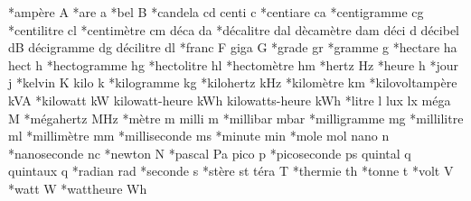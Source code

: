 *ampère             A%
*are                a%
*bel                B%
*candela            cd%
centi               c%
*centiare           ca%
*centigramme        cg%
*centilitre         cl%
*centimètre         cm%
déca                da%
*décalitre          dal%
dècamètre           dam%
déci                d%
décibel             dB%
décigramme             dg%
décilitre             dl%
*franc              F%
giga                G%
*grade              gr%
*gramme             g%
*hectare            ha%
hect                h%
*hectogramme        hg%
*hectolitre         hl%
*hectomètre         hm%
*hertz              Hz%
*heure              h%
*jour               j%
*kelvin             K%
kilo                k%
*kilogramme         kg%
*kilohertz          kHz%
*kilomètre          km%
*kilovoltampère        kVA%
*kilowatt           kW%
kilowatt-heure      kWh%
kilowatts-heure     kWh%
*litre              l%
lux                 lx%
méga              M%
*mégahertz          MHz%
*mètre              m%
milli               m%
*millibar           mbar%
*milligramme        mg%
*millilitre         ml%
*millimètre         mm%
*milliseconde        ms%
*minute             min%
*mole               mol%
nano                n%
*nanoseconde        nc%
*newton             N%
*pascal             Pa%
pico                p%
*picoseconde        ps%
quintal             q%
quintaux            q%
*radian             rad%
*seconde            s%
*stère              st%
téra              T%
*thermie            th%
*tonne              t%
*volt               V%
*watt               W%
*wattheure          Wh%

